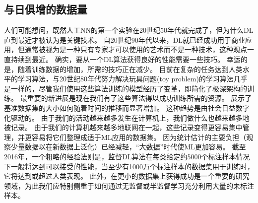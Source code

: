 \subsection{与日俱增的数据量}
\label{sec:increasing_dataset_sizes}
人们可能想问，既然人工\gls{NN}的第一个实验在20世纪50年代就完成了，但为什么\gls{DL}直到最近才被认为是关键技术。
自20世纪90年代以来，\gls{DL}就已经成功用于商业应用，但通常被视为是一种只有专家才可以使用的艺术而不是一种技术，这种观点一直持续到最近。
确实，要从一个\gls{DL}算法获得良好的性能需要一些技巧。
幸运的是，随着训练数据的增加，所需的技巧正在减少。
目前在复杂的任务达到人类水平的学习算法，与20世纪80年代努力解决玩具问题(toy problem)的学习算法几乎是一样的，尽管我们使用这些算法训练的模型经历了变革，即简化了极深架构的训练。
最重要的新进展是现在我们有了这些算法得以成功训练所需的资源。
展示了基准数据集的大小如何随着时间的推移而显著增加。
这种趋势是由社会日益数字化驱动的。
由于我们的活动越来越多发生在计算机上，我们做什么也越来越多地被记录。
由于我们的计算机越来越多地联网在一起，这些记录变得更容易集中管理，并更容易将它们整理成适于\gls{ML}应用的数据集。
因为统计估计的主要负担（观察少量数据以在新数据上泛化）已经减轻，``大数据''时代使\gls{ML}更加容易。
截至2016年，一个粗略的经验法则是，监督\gls{DL}算法在每类给定约5000个标注样本情况下一般将达到可以接受的性能，当至少有1000万个标注样本的数据集用于训练时，它将达到或超过人类表现。
此外，在更小的数据集上获得成功是一个重要的研究领域，为此我们应特别侧重于如何通过无监督或半监督学习充分利用大量的未标注样本。

